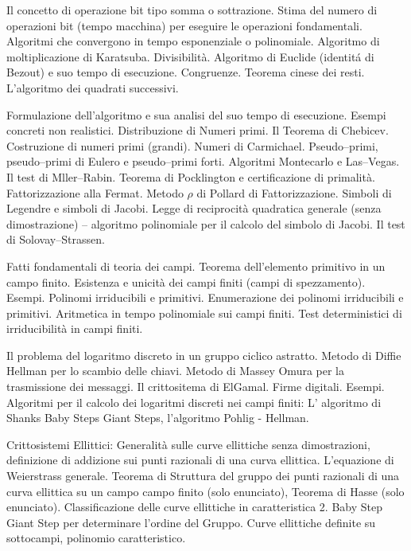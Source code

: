  
\def\abbrcorso{CR410}
\def\titolocorso{Crittografia I}
\def\sottotitolo{Crittografia a chiave pubblica}
\def\docente{Prof. Francesco Pappalardi} \def\crediti{7}
\def\semestre{II} 
\def\esoneri{1} 
\def\scrittofinale{1}
\def\oralefinale{1} 
\def\altreprove{0}

\Intestazione

Il concetto di operazione bit tipo somma o sottrazione. Stima del
numero di operazioni bit (tempo macchina) per eseguire le
operazioni fondamentali. Algoritmi che convergono in tempo
esponenziale o polinomiale. Algoritmo di moltiplicazione di Karatsuba. 
Divisibilit\`a. Algoritmo di Euclide (identit\'a di Bezout) e suo tempo di esecuzione. Congruenze.
Teorema cinese dei resti. L'algoritmo dei quadrati successivi.

Formulazione dell'algoritmo e sua analisi  del suo tempo di esecuzione.
Esempi concreti non realistici. Distribuzione di Numeri primi. Il
Teorema di Chebicev. Costruzione di numeri primi (grandi). Numeri di Carmichael.
Pseudo--primi, pseudo--primi di Eulero e pseudo--primi forti.
Algoritmi Montecarlo e Las--Vegas. Il test di Mller--Rabin. Teorema di Pocklington e certificazione
di primalit\`{a}. Fattorizzazione alla Fermat. Metodo $\rho$ di Pollard
di Fattorizzazione. Simboli
di Legendre e simboli di Jacobi. Legge di reciprocit\`{a}
quadratica generale (senza dimostrazione) -- algoritmo polinomiale
per il calcolo del simbolo di Jacobi. Il test di Solovay--Strassen.

 Fatti fondamentali di teoria dei
campi. Teorema dell'elemento primitivo in un campo finito.
Esistenza e unicit\`a dei campi finiti (campi di spezzamento).
Esempi. Polinomi irriducibili e primitivi. Enumerazione dei
polinomi irriducibili e primitivi. Aritmetica in tempo polinomiale
sui campi finiti. Test deterministici di irriducibilit\`{a} in
campi finiti.

 Il problema del logaritmo
discreto in un gruppo ciclico astratto. Metodo di Diffie Hellman
per lo scambio delle chiavi. Metodo di Massey Omura per la
trasmissione dei messaggi. Il crittositema di ElGamal. Firme
digitali. Esempi. Algoritmi per il calcolo dei
logaritmi discreti nei campi finiti: L' algoritmo di Shanks
Baby Steps Giant Steps, l'algoritmo Pohlig - Hellman.

Crittosistemi Ellittici: Generalit\`{a} sulle curve ellittiche senza
dimostrazioni,
definizione di addizione sui punti razionali di una curva
ellittica. L'equa\-zio\-ne di Weierstrass generale. Teorema di Struttura del
gruppo dei punti razionali di una curva ellittica su un campo campo
finito (solo enunciato), Teorema di Hasse (solo enunciato). Classificazione 
delle curve ellittiche in caratteristica 2. Baby Step Giant Step per determinare
l'ordine del Gruppo. Curve ellittiche definite su sottocampi, polinomio caratteristico.


